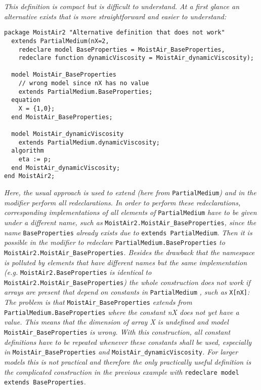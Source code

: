 \emph{This definition is compact but is difficult to understand. At a
first glance an alternative exists that is more straightforward and
easier to understand: }
\begin{lstlisting}[language=modelica]
package MoistAir2 "Alternative definition that does not work"
  extends PartialMedium(nX=2,
    redeclare model BaseProperties = MoistAir_BaseProperties,
    redeclare function dynamicViscosity = MoistAir_dynamicViscosity);

  model MoistAir_BaseProperties
    // wrong model since nX has no value
    extends PartialMedium.BaseProperties;
  equation
    X = {1,0};
  end MoistAir_BaseProperties;

  model MoistAir_dynamicViscosity
    extends PartialMedium.dynamicViscosity;
  algorithm
    eta := p;
  end MoistAir_dynamicViscosity;
end MoistAir2;
\end{lstlisting}

\emph{Here, the usual approach is used to extend (here from} \lstinline!PartialMedium!\emph{) and
in the modifier perform all redeclarations. In order to perform these
redeclarations, corresponding implementations of all elements of} \lstinline!PartialMedium! 
\emph{have to be given under a different name, such as} \lstinline!MoistAir2.MoistAir_BaseProperties!\emph{, since the name} 
\lstinline!BaseProperties! 
\emph{already exists due to} \lstinline!extends PartialMedium!. \emph{Then it is possible in
the modifier to redeclare} \lstinline!PartialMedium.BaseProperties! \emph{to} 
\lstinline!MoistAir2.MoistAir_BaseProperties!\emph{. Besides the drawback that the
namespace is polluted by elements that have different names but the same
implementation (e.g.} \lstinline!MoistAir2.BaseProperties! \emph{is identical to} 
\lstinline!MoistAir2.MoistAir_BaseProperties!\emph{) the whole construction does not work
if arrays are present that depend on constants in} \lstinline!PartialMedium! \emph{, such as} 
\lstinline!X[nX]!\emph{: The problem is that} \lstinline!MoistAir_BaseProperties!\emph{ extends from} 
\lstinline!PartialMedium.BaseProperties! \emph{where the constant nX does not yet have a value. 
This means that the dimension of array X is undefined and model}
\lstinline!MoistAir_BaseProperties!\emph{ is wrong. With this construction, all constant
definitions have to be repeated whenever these constants shall be used,
especially in} \lstinline!MoistAir_BaseProperties! \emph{and} \lstinline!MoistAir_dynamicViscosity!\emph{.
For larger models this is not practical and therefore the only
practically useful definition is the complicated construction in the
previous example with} \lstinline!redeclare model extends BaseProperties!\emph{.}

